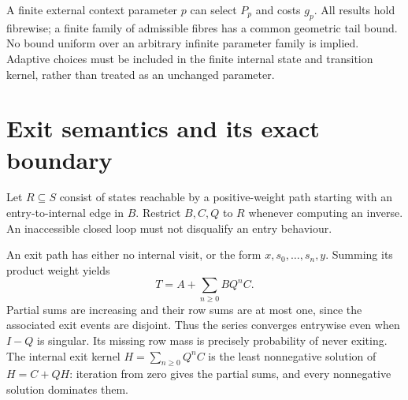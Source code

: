 \documentclass[11pt]{article}
\begin{document}
A finite external context parameter $p$ can select $P_p$ and costs $g_p$. All results hold fibrewise; a finite family of admissible fibres has a common geometric tail bound. No bound uniform over an arbitrary infinite parameter family is implied. Adaptive choices must be included in the finite internal state and transition kernel, rather than treated as an unchanged parameter.

\section{Exit semantics and its exact boundary}
Let $R\subseteq S$ consist of states reachable by a positive-weight path starting with an entry-to-internal edge in $B$. Restrict $B,C,Q$ to $R$ whenever computing an inverse. An inaccessible closed loop must not disqualify an entry behaviour.

An exit path has either no internal visit, or the form $x,s_0,\ldots,s_n,y$. Summing its product weight yields
\[T=A+\sum_{n\geq0}BQ^nC.\tag{1}\]
Partial sums are increasing and their row sums are at most one, since the associated exit events are disjoint. Thus the series converges entrywise even when $I-Q$ is singular. Its missing row mass is precisely probability of never exiting. The internal exit kernel $H=\sum_{n\geq0}Q^nC$ is the least nonnegative solution of $H=C+QH$: iteration from zero gives the partial sums, and every nonnegative solution dominates them.
\end{document}
